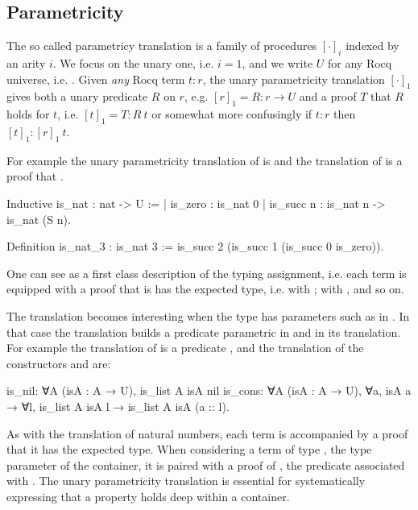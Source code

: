 \documentclass[a4paper, 11pt]{book}
\begin{document}
\subsection{Parametricity}\label{sec:param1}

The so called parametricy translation \cite{keller_et_al:LIPIcs.CSL.2012.381}
is a family of procedures $[\cdot]_i$ indexed by an arity $i$. We focus on the
unary one, i.e. $i=1$, and we write $U$ for any Rocq universe, i.e. .
Given \emph{any} Rocq term $t : r$, the unary parametricity
translation $[\cdot]_1$ gives both a unary predicate $R$ on $r$, e.g. $[r]_1 = R : r \to U$
and a proof $T$ that $R$ holds for $t$, i.e. $[t]_1 = T : R~ t$ or somewhat more
confusingly if $t : r$ then $[t]_1 : [r]_1~ t$.

For example the unary parametricity translation of
 is  and
the translation of  is a proof that .

\begin{rocqcode}
Inductive is_nat : nat -> U :=
| is_zero : is_nat 0
| is_succ n : is_nat n -> is_nat (S n).

Definition is_nat_3 : is_nat 3 :=
  is_succ 2 (is_succ 1 (is_succ 0 is_zero)).
\end{rocqcode}

One can see  as a first class description of the
typing assignment, i.e. each term is equipped with a proof that
is has the expected type, i.e.  with ;
 with , and so on.

The translation becomes interesting when the type has parameters such as
 in . In that case the translation builds
a predicate parametric in  and in its translation. For example
the translation of  is a predicate
,
and the translation of the constructors  and 
are:
\begin{rocqcode}
is_nil: ∀A (isA : A → U), is_list A isA nil
is_cons: ∀A (isA : A → U), ∀a, isA a → 
  ∀l, is_list A isA l → is_list A isA (a :: l).
\end{rocqcode}


As with the translation of natural numbers, each term is accompanied by a proof
that it has the expected type. When considering a term  of
type , the type parameter of the container, it is paired with a proof of
, the predicate associated with . The unary parametricity
translation is essential for systematically expressing that a property holds deep
within a container.
\end{document}
